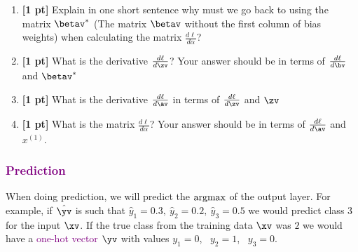 \begin{enumerate}
\begin{enumerate}
        
        
        \item \textbf{[1 pt]} Explain in one short sentence why must we go back to using the matrix $\betav^*$ (The matrix $\betav$ without the first column of bias weights) when calculating the matrix $\frac{d\ell}{d\alpha}$?
        
        
        \begin{tcolorbox}[fit,height=1cm, width=15cm, blank, borderline={1pt}{-2pt}]
        \end{tcolorbox}
        
        
        \item \textbf{[1 pt]} What is the derivative $\frac{d\ell}{d\zv}$? Your answer should be in terms of $\frac{d\ell}{d\bv}$ and $\betav^*$
        
        
        \begin{tcolorbox}[fit,height=3cm, width=12cm, blank, borderline={1pt}{-2pt}]
        \end{tcolorbox}
        
    
        \item \textbf{[1 pt]} What is the derivative $\frac{d\ell}{d\av}$ in terms of $\frac{d\ell}{d\zv}$ and $\zv$
        
        
        \begin{tcolorbox}[fit,height=3cm, width=12cm, blank, borderline={1pt}{-2pt}]
        \end{tcolorbox}
        
        
        \item \textbf{[1 pt]} What is the matrix $\frac{d\ell}{d\alpha}$? Your answer should be in terms of $\frac{d\ell}{d\av}$ and $x^{(1)}$.
        
        
        \begin{tcolorbox}[fit,height=3cm, width=12cm, blank, borderline={1pt}{-2pt}]
        \end{tcolorbox}

\end{enumerate}



\subsubsection*{\textcolor{purple}{Prediction}}
When doing prediction, we will predict the \textcolor{purple}{$\mathop{\mathrm{argmax}}$} of the output layer. For example, if $\hat{\yv}$ is such that $\hat{y}_1=0.3,~ \hat{y}_2=0.2,~ \hat{y}_3=0.5$ we would predict class 3 for the input $\xv$. If the true class from the training data $\xv$ was $2$ we would have a \textcolor{purple}{one-hot vector} $\yv$ with values $y_1=0$,~ $y_2=1$,~ $y_3=0$.
    

\end{enumerate}
